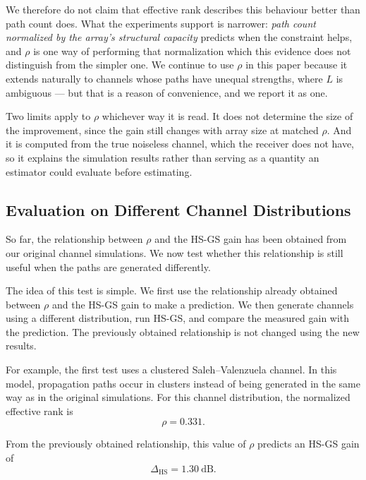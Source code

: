 \documentclass[journal]{IEEEtran}
\begin{document}
We therefore do not claim that effective rank describes this behaviour better
than path count does. What the experiments support is narrower: \emph{path
count normalized by the array's structural capacity} predicts when the
constraint helps, and $\rho$ is one way of performing that normalization which
this evidence does not distinguish from the simpler one. We continue to use
$\rho$ in this paper because it extends naturally to channels whose paths have
unequal strengths, where $L$ is ambiguous --- but that is a reason of
convenience, and we report it as one.

Two limits apply to $\rho$ whichever way it is read. It does not determine the
size of the improvement, since the gain still changes with array size at
matched $\rho$. And it is computed from the true noiseless channel, which the
receiver does not have, so it explains the simulation results rather than
serving as a quantity an estimator could evaluate before estimating.

\subsection{Evaluation on Different Channel Distributions}

So far, the relationship between $\rho$ and the HS-GS gain has been obtained
from our original channel simulations. We now test whether this relationship is
still useful when the paths are generated differently.

The idea of this test is simple. We first use the relationship already obtained
between $\rho$ and the HS-GS gain to make a prediction. We then generate
channels using a different distribution, run HS-GS, and compare the measured
gain with the prediction. The previously obtained relationship is not changed
using the new results.

For example, the first test uses a clustered Saleh--Valenzuela channel. In this
model, propagation paths occur in clusters instead of being generated in the
same way as in the original simulations. For this channel distribution, the
normalized effective rank is
\begin{equation}
\rho=0.331.
\end{equation}

From the previously obtained relationship, this value of $\rho$ predicts an
HS-GS gain of
\begin{equation}
\Delta_{\mathrm{HS}}=1.30~\mathrm{dB}.
\end{equation}
\end{document}
